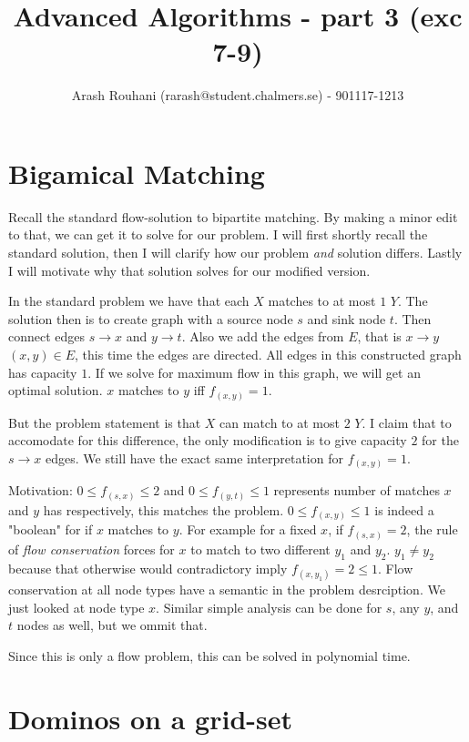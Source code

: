 \documentclass[a4paper,11pt]{article}
\title{Advanced Algorithms - part 3 (exc 7-9)}
\author{Arash Rouhani (rarash@student.chalmers.se) - 901117-1213}
\begin{document}
\maketitle


\section{Bigamical Matching}

Recall the standard flow-solution to bipartite matching.
By making a minor edit to that, we can get it to solve for our problem.
I will first shortly recall the standard solution, then I will
clarify how our problem \emph{and} solution differs.
Lastly I will motivate why that solution solves for our modified version.

In the standard problem we have that each $X$ matches to at most $1$ $Y$.
The solution then is to create graph with a source node $s$ and
sink node $t$. Then connect edges $s \to x$ and $y \to t$. Also
we add the edges from $E$, that is $x \to y$ $(x,y) \in E$,
this time the edges are directed. All edges in this constructed graph
has capacity $1$.
If we solve for maximum flow in this graph, we will get an optimal
solution. $x$ matches to $y$ iff $f_{(x,y)} = 1$.

But the problem statement is that $X$ can match to at most $2$ $Y$.
I claim that to accomodate for this difference, the only modification
is to give capacity $2$ for the $s \to x$ edges.
We still have the exact same interpretation for $f_{(x,y)} = 1$.

Motivation: $0 \leq f_{(s, x)} \leq 2$ and $0 \leq f_{(y, t)} \leq 1$
represents number of matches $x$ and $y$ has respectively,
this matches the problem. $0 \leq f_{(x, y)} \leq 1$ is indeed
a "boolean" for if $x$ matches to $y$. For example for a fixed
$x$, if $f_{(s, x)} = 2$, the rule of \emph{flow conservation}
forces for $x$ to match to two different $y_1$ and $y_2$.
$y_1 \neq y_2$ because that otherwise would contradictory imply
$f_{(x, y_1)} = 2 \leq 1$. Flow conservation
at all node types have a semantic in the problem desrciption.
We just looked at node type $x$. Similar simple analysis
can be done for $s$, any $y$, and $t$ nodes as well,
but we ommit that.

Since this is only a flow problem, this can be solved
in polynomial time.

\section{Dominos on a grid-set}
\end{document}
